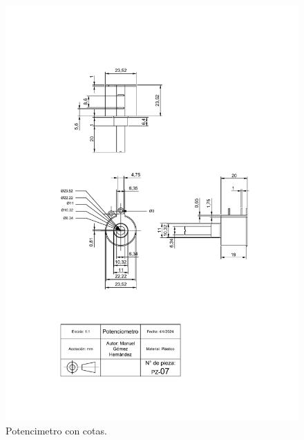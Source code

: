     \begin{figure}[H]
        \centering
        \includegraphics[scale=0.4]{15/img/potenciometroTrazo.pdf}
        \caption{Potencimetro con cotas.}
        \label{fig:potenciometroTrazo}
    \end{figure}
    
